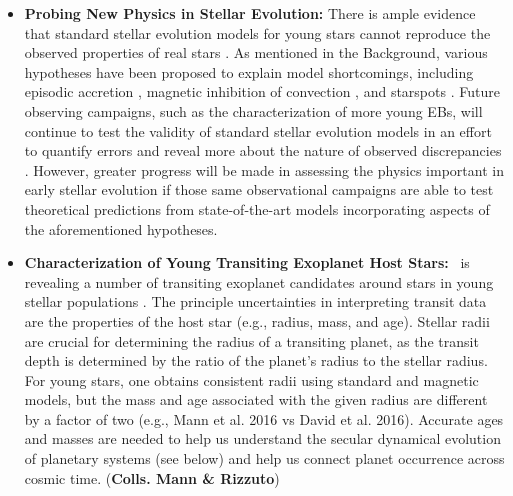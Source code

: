 \begin{itemize}
	\item {\bf Probing New Physics in Stellar Evolution:} There is ample evidence that standard stellar evolution models for young stars cannot reproduce the observed properties of real stars \citep[e.g.,][]{Hillenbrand2004, Soderblom2014, Stassun2014}. As mentioned in the Background, various hypotheses have been proposed to explain model shortcomings, including episodic accretion \citep[e.g.,][]{Baraffe2009}, magnetic inhibition of convection \citep[e.g.,][]{Feiden2016}, and starspots \citep[e.g.,][]{Jackson2009}. Future observing campaigns, such as the characterization of more young EBs, will continue to test the validity of standard stellar evolution models in an effort to quantify errors and reveal more about the nature of observed discrepancies \citep[e.g.,][]{Kraus2015}. However, greater progress will be made in assessing the physics important in early stellar evolution if those same observational campaigns are able to test theoretical predictions from state-of-the-art models incorporating aspects of the aforementioned hypotheses. \\
	

	\item {\bf Characterization of Young Transiting Exoplanet Host Stars:} \kepler\ is revealing a number of transiting exoplanet candidates around stars in young stellar populations \citep[e.g,][]{Mann2016, Mann2016b, David2016}. The principle uncertainties in interpreting transit data are the properties of the host star (e.g., radius, mass, and age). Stellar radii are crucial for determining the radius of a transiting planet, as the transit depth is determined by the ratio of the planet's radius to the stellar radius. For young stars, one obtains consistent radii using standard and magnetic models, but the mass and age associated with the given radius are different by a factor of two (e.g., Mann et al. 2016 vs David et al. 2016). Accurate ages and masses are needed to help us understand the secular dynamical evolution of planetary systems (see below) and help us connect planet occurrence across cosmic time. ({\bf Colls. Mann \& Rizzuto})   \\
	

\end{itemize}
